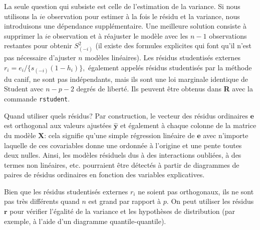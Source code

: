 \documentclass[
  11pt,
  letterpaper,
]{scrbook}
\theoremstyle{plain}
\theoremstyle{plain}
\theoremstyle{definition}
\theoremstyle{definition}
\theoremstyle{remark}
\begin{document}
La seule question qui subsiste est celle de l'estimation de la variance.
Si nous utilisons la \(i\)e observation pour estimer à la fois le résidu
et la variance, nous introduisons une dépendance supplémentaire. Une
meilleure solution consiste à supprimer la \(i\)e observation et à
réajuster le modèle avec les \(n-1\) observations restantes pour obtenir
\(S^2_{(-i)}\) (il existe des formules explicites qui font qu'il n'est
pas nécessaire d'ajuster \(n\) modèles linéaires). Les résidus
studentisés externes \(r_i = e_i/\{s_{(-i)}(1-h_i)\},\) également
appelés résidus studentisés par la méthode du canif, ne sont pas
indépendants, mais ils sont une loi marginale identique de Student avec
\(n-p-2\) degrés de liberté. Ils peuvent être obtenus dans \textbf{R}
avec la commande \texttt{rstudent}.

Quand utiliser quels résidus? Par construction, le vecteur des résidus
ordinaires \(\boldsymbol{e}\) est orthogonal aux valeurs ajustées
\(\widehat{\boldsymbol{y}}\) et également à chaque colonne de la matrice
du modèle \(\mathbf{X}\): cela signifie qu'une simple régression
linéaire de \(\boldsymbol{e}\) avec n'importe laquelle de ces
covariables donne une ordonnée à l'origine et une pente toutes deux
nulles. Ainsi, les modèles résiduels dus à des interactions oubliées, à
des termes non linéaires, etc. pourraient être détectés à partir de
diagrammes de paires de résidus ordinaires en fonction des variables
explicatives.

Bien que les résidus studentisés externes \(r_i\) ne soient pas
orthogonaux, ils ne sont pas très différents quand \(n\) est grand par
rapport à \(p.\) On peut utiliser les résidus \(\boldsymbol{r}\) pour
vérifier l'égalité de la variance et les hypothèses de distribution (par
exemple, à l'aide d'un diagramme quantile-quantile).
\end{document}
